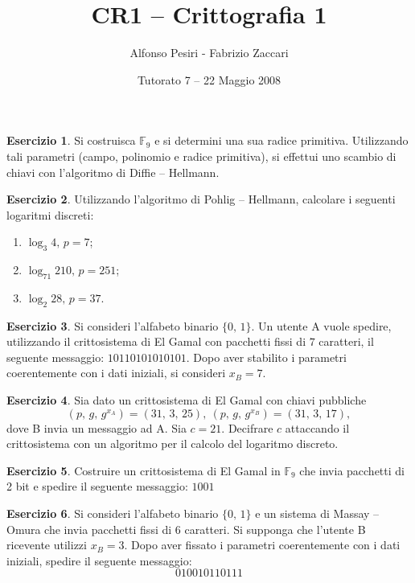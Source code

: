 \documentclass[a4paper,11pt]{article}
\title{CR1 -- Crittografia 1}
\date{Tutorato 7 -- 22 Maggio 2008}
\author{\Large{Alfonso Pesiri - Fabrizio Zaccari}}
\def\F{{\mathbb F}}
\begin{document}
\maketitle
\theoremstyle{definition}
\newtheorem{es}{Esercizio}

\begin{es}
Si costruisca $\F_9$ e si determini una sua radice primitiva. Utilizzando tali parametri (campo, polinomio e radice primitiva), si effettui uno scambio di chiavi con l'algoritmo di Diffie -- Hellmann.
\end{es}
\medskip

\begin{es}
Utilizzando l'algoritmo di Pohlig -- Hellmann, calcolare i seguenti logaritmi discreti:
\begin{enumerate}
\item $\log_{3}4,\,p=7$;
\item $\log_{71}210,\,p=251$;
\item $\log_{2}28,\,p=37$.
\end{enumerate}
\end{es}
\medskip

\begin{es}
Si consideri l'alfabeto binario $\{0,\,1\}$. Un utente A vuole spedire, utilizzando il crittosistema di El Gamal con pacchetti fissi di $7$ caratteri, il seguente messaggio: $10110101010101$. Dopo aver stabilito i parametri coerentemente con i dati iniziali, si consideri $x_B=7$.
\end{es}
\medskip


\begin{es}
Sia dato un crittosistema di El Gamal con chiavi pubbliche $$(p,\,g,\,g^{x_A})=(31,\,3,\,25),\:(p,\,g,\,g^{x_B})=(31,\,3,\,17),$$ dove B invia un messaggio ad A. Sia $c=21$. Decifrare $c$ attaccando il crittosistema con un algoritmo per il calcolo del logaritmo discreto.
\end{es}
\medskip


\begin{es}
Costruire un crittosistema di El Gamal in $\F_9$ che invia pacchetti di 2 bit e spedire il seguente messaggio: $1001$
\end{es}
\medskip


\begin{es}
Si consideri l'alfabeto binario $\{0,\,1\}$ e un sistema di Massay -- Omura che invia pacchetti fissi di $6$ caratteri. Si supponga che l'utente B ricevente utilizzi $x_B=3$. Dopo aver fissato i parametri coerentemente con i dati iniziali, spedire il seguente messaggio: $$010010110111$$
\end{es}
\medskip


\clearpage
\nocite{*}
\end{document}
